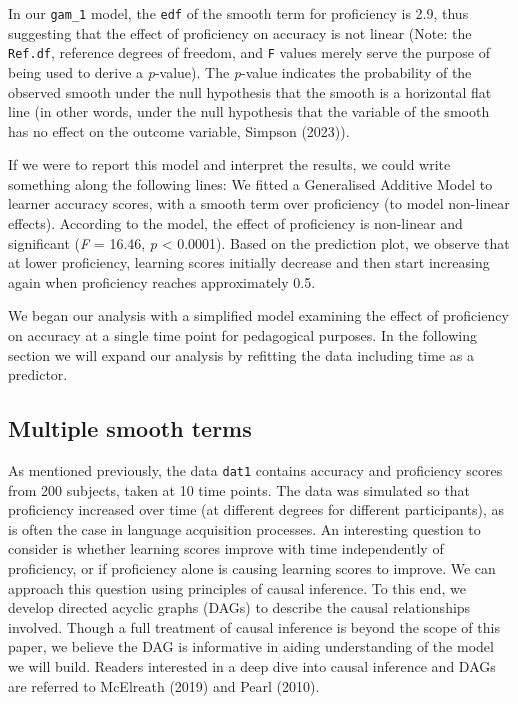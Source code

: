 \documentclass[
  letterpaper,
  DIV=11,
  numbers=noendperiod]{scrartcl}
\begin{document}
In our \texttt{gam\_1} model, the \texttt{edf} of the smooth term for
proficiency is 2.9, thus suggesting that the effect of proficiency on
accuracy is not linear (Note: the \texttt{Ref.df}, reference degrees of
freedom, and \texttt{F} values merely serve the purpose of being used to
derive a \emph{p}-value). The \emph{p}-value indicates the probability
of the observed smooth under the null hypothesis that the smooth is a
horizontal flat line (in other words, under the null hypothesis that the
variable of the smooth has no effect on the outcome variable, Simpson
(2023)).

If we were to report this model and interpret the results, we could
write something along the following lines: We fitted a Generalised
Additive Model to learner accuracy scores, with a smooth term over
proficiency (to model non-linear effects). According to the model, the
effect of proficiency is non-linear and significant (\emph{F} = 16.46,
\emph{p} \textless{} 0.0001). Based on the prediction plot, we observe
that at lower proficiency, learning scores initially decrease and then
start increasing again when proficiency reaches approximately 0.5.

We began our analysis with a simplified model examining the effect of
proficiency on accuracy at a single time point for pedagogical purposes.
In the following section we will expand our analysis by refitting the
data including time as a predictor.

\subsection{Multiple smooth terms}\label{multiple-smooth-terms}

As mentioned previously, the data \texttt{dat1} contains accuracy and
proficiency scores from 200 subjects, taken at 10 time points. The data
was simulated so that proficiency increased over time (at different
degrees for different participants), as is often the case in language
acquisition processes. An interesting question to consider is whether
learning scores improve with time independently of proficiency, or if
proficiency alone is causing learning scores to improve. We can approach
this question using principles of causal inference. To this end, we
develop directed acyclic graphs (DAGs) to describe the causal
relationships involved. Though a full treatment of causal inference is
beyond the scope of this paper, we believe the DAG is informative in
aiding understanding of the model we will build. Readers interested in a
deep dive into causal inference and DAGs are referred to McElreath
(2019) and Pearl (2010).
\end{document}
